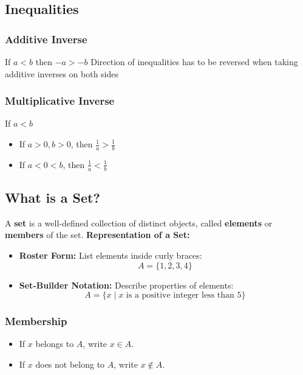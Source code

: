 \subsection{Inequalities}
\subsubsection{Additive Inverse}
If \( a < b \) then \( -a > -b \)
Direction of inequalities has to be reversed when taking additive inverses on both sides 
\subsubsection{Multiplicative Inverse}
If \( a < b \)
\begin{itemize}
    \item If \(a > 0, b > 0\), then \(\frac{1}{a} > \frac{1}{b} \)
    \item If \(a < 0 < b\), then \(\frac{1}{a} < \frac{1}{b} \)
\end{itemize} 

\subsection{What is a Set?}
A \textbf{set} is a well-defined collection of distinct objects, called \textbf{elements} or \textbf{members} of the set.
\textbf{Representation of a Set:}
\begin{itemize}
    \item \textbf{Roster Form:} List elements inside curly braces:
    \[
    A = \{1, 2, 3, 4\}
    \]
    \item \textbf{Set-Builder Notation:} Describe properties of elements:
    \[
    A = \{x \mid x \text{ is a positive integer less than 5}\}
    \]
\end{itemize}
\subsubsection{Membership}
\begin{itemize}
    \item If \(x\) belongs to \(A\), write \(x \in A\).
    \item If \(x\) does not belong to \(A\), write \(x \notin A\).
\end{itemize}

